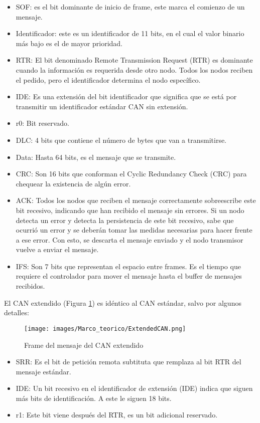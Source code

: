 \begin{itemize}
  \item SOF: es el bit dominante de inicio de frame, este marca el comienzo de un mensaje.
  \item Identificador: este es un identificador de 11 bits, en el cual el valor binario más bajo es el de mayor prioridad.
  \item RTR: El bit denominado Remote Transmission Request (RTR) es dominante cuando la información es requerida desde otro nodo.
    Todos los nodos reciben el pedido, pero el identificador determina el nodo específico.
  \item IDE: Es una extensión del bit identificador que significa que se está por transmitir un identificador estándar CAN sin extensión.
  \item r0: Bit reservado.
  \item DLC: 4 bits que contiene el  número de bytes que van a transmitirse.
  \item Data: Hasta 64 bits, es el mensaje que se transmite.
  \item CRC: Son 16 bits que conforman el Cyclic Redundancy Check (CRC) para chequear la existencia de algún error.
  \item ACK: Todos los nodos que reciben el mensaje correctamente sobreescribe este bit recesivo, indicando que han recibido el mensaje sin errores. Si un nodo detecta un error y detecta la persistencia de este bit recesivo, sabe que ocurrió un error y se deberán tomar las medidas necesarias para hacer frente a ese error. Con esto, se descarta el mensaje enviado y el nodo transmisor vuelve a enviar el mensaje.
  \item IFS: Son 7 bits que representan el espacio entre frames. Es el tiempo que requiere el controlador para mover el mensaje hasta el buffer de mensajes recibidos.
\end{itemize}

El CAN extendido (Figura \ref{fig:extendedCAN}) es idéntico al CAN estándar, salvo por algunos detalles:

\begin{figure}[h]
 \centering
 \texttt{[image: images/Marco\_teorico/ExtendedCAN.png]}
  \caption{Frame del mensaje del CAN extendido}
\label{fig:extendedCAN}
\end{figure}

\begin{itemize}
  \item SRR: Es el bit de petición remota subtituta que remplaza al bit RTR del mensaje estándar.
  \item IDE: Un bit recesivo en el identificador de extensión (IDE) indica que siguen más bits de identificación. A este le siguen 18 bits.
  \item r1: Este bit viene después del RTR, es un bit adicional reservado.
\end{itemize}


